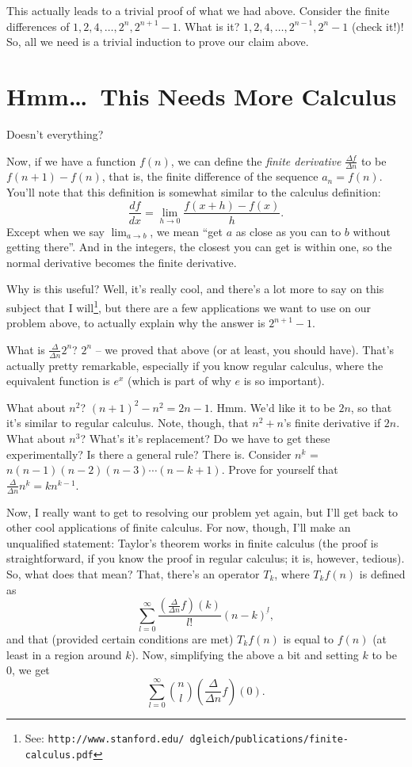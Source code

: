 \documentclass[12pt,letterpaper]{article}
\begin{document}
This actually leads to a trivial proof of what we had above. Consider
the finite differences of $1, 2, 4, \ldots, 2^n, 2^{n+1}-1$. What is
it? $1, 2, 4, \ldots, 2^{n-1}, 2^n-1$ (check it!)! So, all we need is
a trivial induction to prove our claim above.

\section{Hmm\dots\ This Needs More Calculus}
Doesn't everything?

Now, if we have a function $f(n)$, we can define the \emph{finite
derivative} $\frac{\Delta f}{\Delta n}$ to be $f(n+1)-f(n)$, that is,
the finite difference of the sequence $a_n = f(n)$. You'll note that
this definition is somewhat similar to the calculus definition:
$$\frac{df}{dx} = \lim_{h\to0}\frac{f(x+h) - f(x)}{h}.$$ Except when
we say $\lim_{a\to b}$, we mean ``get $a$ as close as you can to $b$
without getting there''. And in the integers, the closest you can get
is within one, so the normal derivative becomes the finite
derivative.

Why is this useful? Well, it's really cool, and there's a lot more to
say on this subject that I will\footnote{See:
\texttt{http://www.stanford.edu/~dgleich/publications/finite-calculus.pdf}},
but there are a few applications we want to use on our problem above,
to actually explain why the answer is $2^{n+1}-1$.

What is $\frac{\Delta}{\Delta n} 2^n$? $2^n$ -- we proved that above
(or at least, you should have). That's actually pretty remarkable,
especially if you know regular calculus, where the equivalent function
is $e^x$ (which is part of why $e$ is so important).

What about $n^2$? $(n+1)^2 - n^2 = 2n - 1$. Hmm. We'd like it to be
$2n$, so that it's similar to regular calculus. Note, though, that
$n^2 + n$'s finite derivative if $2n$. What
about $n^3$? What's it's replacement? Do we have to get these
experimentally? Is there a general rule? There is. Consider
$n^{\underbar k}$ = $n (n-1) (n-2) (n-3) \cdots (n-k+1)$. Prove for
yourself that $\frac{\Delta}{\Delta n} n^{\underbar k} = k n^{k-1}$.

Now, I really want to get to resolving our problem yet again, but I'll
get back to other cool applications of finite calculus. For now,
though, I'll make an unqualified statement: Taylor's theorem works in
finite calculus (the proof is straightforward, if you know the proof
in regular calculus; it is, however, tedious). So, what does that
mean? That, there's an operator $T_k$, where $T_k f(n)$ is defined as
$$\sum_{l=0}^{\infty} \frac{\left(\frac{\Delta}{\Delta n} f\right)(k)}{l!}
(n-k)^{\underbar l},$$ and that (provided certain conditions are met) $T_k f(n)$
is equal to $f(n)$ (at least in a region around $k$). Now, simplifying
the above a bit and setting $k$ to be 0, we get $$\sum_{l=0}^\infty
\binom{n}{l} \left(\frac{\Delta}{\Delta n} f\right)(0).$$
\end{document}
